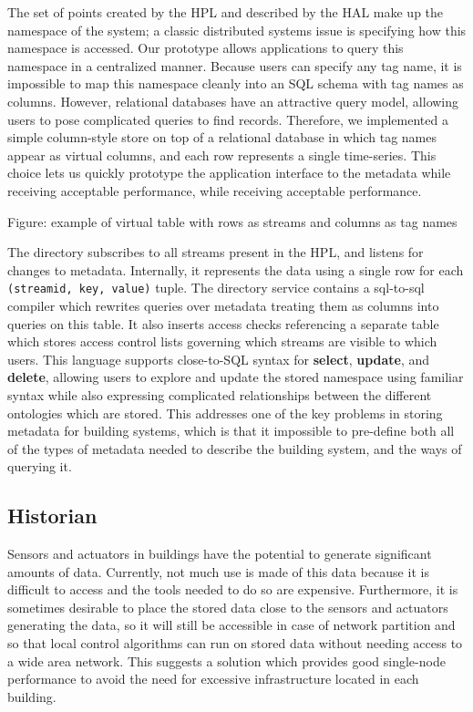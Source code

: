 The set of points created by the HPL and described by the HAL make up the namespace of the system; a classic distributed systems issue is specifying how this namespace is accessed.  Our prototype allows applications to query this namespace in a centralized manner.  Because users can specify any tag name, it is impossible to map this namespace cleanly into an SQL schema with tag names as columns.  However, relational databases have an attractive query model, allowing users to pose complicated queries to find records.  Therefore, we implemented a simple column-style store on top of a relational database in which tag names appear as virtual columns, and each row represents a single time-series.  This choice lets us quickly prototype the application interface to the metadata while receiving acceptable performance, while receiving acceptable performance.  

Figure: example of virtual table with rows as streams and columns as tag names

The directory subscribes to all streams present in the HPL, and listens for changes to metadata.  Internally, it represents the data using a single row for each {\tt (streamid, key, value)} tuple.  The directory service contains a sql-to-sql compiler which rewrites queries over metadata treating them as columns into queries on this table.  It also inserts access checks referencing a separate table which stores access control lists governing which streams are visible to which users.  
%
This language supports close-to-SQL syntax for {\bf select}, {\bf update}, and {\bf delete}, allowing users to explore and update the stored namespace using familiar syntax while also expressing complicated relationships between the different ontologies which are stored.  This addresses one of the key problems in storing metadata for building systems, which is that it impossible to pre-define both all of the types of metadata needed to describe the building system, and the ways of querying it.

\subsection{Historian}

Sensors and actuators in buildings have the potential to generate significant amounts of data. Currently, not much use is made of this data because it is difficult to access and the tools needed to do so are expensive.  Furthermore, it is sometimes desirable to place the stored data close to the sensors and actuators generating the data, so it will still be accessible in case of network partition and so that local control algorithms can run on stored data without needing access to a wide area network.  This suggests a solution which provides good single-node performance to avoid the need for excessive infrastructure located in each building. 

